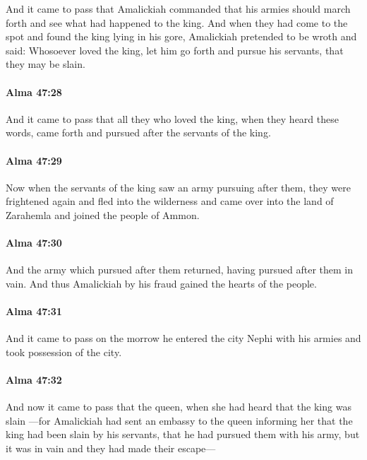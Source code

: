 			And it came to pass that Amalickiah commanded
			that his armies should march forth and see what had happened to the king.
			And when they had come to the spot and found the king lying in his gore,
			Amalickiah pretended to be wroth and said:
			Whosoever loved the king, let him go forth and pursue his servants,
			that they may be slain.

		\paragraph{Alma 47:28} %
			\label{ALMA-47-28}

			And it came to pass that all they who loved the king,
			when they heard these words,
			came forth and pursued after the servants of the king.

		\paragraph{Alma 47:29} %
			\label{ALMA-47-29}

			Now when the servants of the king saw an army pursuing after them,
			they were frightened again and fled into the wilderness
			and came over into the land of Zarahemla and joined the people of Ammon.

		\paragraph{Alma 47:30} %
			\label{ALMA-47-30}

			And the army which pursued after them returned,
			having pursued after them in vain.
			And thus Amalickiah by his fraud gained the hearts of the people.

		\paragraph{Alma 47:31} %
			\label{ALMA-47-31}

			And it came to pass on the morrow
			he entered the city Nephi with his armies and took possession of the city.

		\paragraph{Alma 47:32} %
			\label{ALMA-47-32}

			And now it came to pass that the queen,
			when she had heard that the king was slain
			---for Amalickiah had sent an embassy to the queen informing her
			that the king had been slain by his servants,
			that he had pursued them with his army,
			but it was in vain and they had made their escape---

